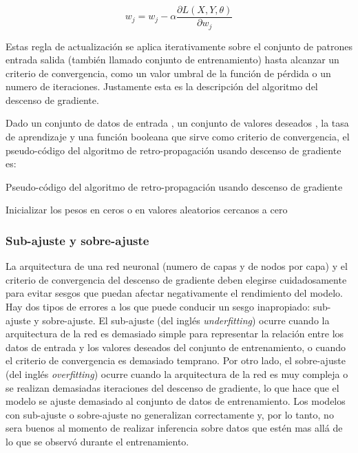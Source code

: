 \begin{equation}
    \label{eq:gd-update-rule-item}
    w_{j} = w_{j} - \alpha \frac{\partial L(X, Y, \theta)}{\partial w_{j}}
\end{equation}

Estas regla de actualización se aplica iterativamente sobre el conjunto de patrones entrada salida (también llamado conjunto de entrenamiento) hasta alcanzar un criterio de convergencia, como un valor umbral de la función de pérdida o un numero de iteraciones. Justamente esta es la descripción del algoritmo del descenso de gradiente.

Dado un conjunto de datos de entrada , un conjunto de valores deseados , la tasa de aprendizaje \jim{\alpha} y una función booleana  que sirve como criterio de convergencia, el pseudo-código del algoritmo de retro-propagación usando descenso de gradiente es:

\begin{algorithm}
\label{alg:dg}
\caption{Pseudo-código del algoritmo de retro-propagación usando descenso de gradiente}
\KwResult{\jim{\theta}}

Inicializar los pesos \jim{\theta} en ceros o en valores aleatorios cercanos a cero

\end{algorithm}

\subsubsection{Sub-ajuste y sobre-ajuste}

La arquitectura de una red neuronal (numero de capas y de nodos por capa) y el criterio de convergencia del descenso de gradiente deben elegirse cuidadosamente para evitar sesgos que puedan afectar negativamente el rendimiento del modelo. Hay dos tipos de errores a los que puede conducir un sesgo inapropiado: sub-ajuste y sobre-ajuste. El sub-ajuste (del inglés \textit{underfitting}) ocurre cuando la arquitectura de la red es demasiado simple para representar la relación entre los datos de entrada y los valores deseados del conjunto de entrenamiento, o cuando el criterio de convergencia es demasiado temprano. Por otro lado, el sobre-ajuste (del inglés \textit{overfitting}) ocurre cuando la arquitectura de la red es muy compleja o se realizan demasiadas iteraciones del descenso de gradiente, lo que hace que el modelo se ajuste demasiado al conjunto de datos de entrenamiento. Los modelos con sub-ajuste o sobre-ajuste no generalizan correctamente y, por lo tanto, no sera buenos al momento de realizar inferencia sobre datos que estén mas allá de lo que se observó durante el entrenamiento.

